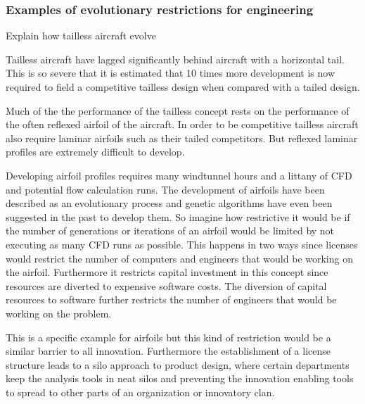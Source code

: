 \documentclass{beamer}
\begin{document}
\begin{frame}
\frametitle{Examples of evolutionary restrictions for engineering}

Explain how tailless aircraft evolve

Tailless aircraft have lagged significantly behind aircraft with a horizontal tail.  This is so severe that it is estimated that 10 times more development is now required to field a competitive tailless design when compared with a tailed design.

Much of the the performance of the tailless concept rests on the performance of the often reflexed airfoil of the aircraft.  In order to be competitive tailless aircraft also require laminar airfoils such as their tailed competitors.  But reflexed laminar profiles are extremely difficult to develop.  

Developing airfoil profiles requires many windtunnel hours and a littany of CFD and potential flow calculation runs.  The development of airfoils have been described as an evolutionary process and genetic algorithms have even been suggested in the past to develop them.
So imagine how restrictive it would be if the number of generations or iterations of an airfoil would be limited by not executing as many CFD runs as possible.
This happens in two ways since licenses would restrict the number of computers and engineers that would be working on the airfoil.  Furthermore it restricts capital investment in this concept since resources are diverted to expensive software costs.  
The diversion of capital resources to software further restricts the number of engineers that would be working on the problem.

This is a specific example for airfoils but this kind of restriction would be a similar barrier to all innovation.  
Furthermore the establishment of a license structure leads to a silo approach to product design, where certain departments keep the analysis tools in neat silos and preventing the innovation enabling tools to spread to other parts of an organization or innovatory clan.

\end{frame}
\end{document}
